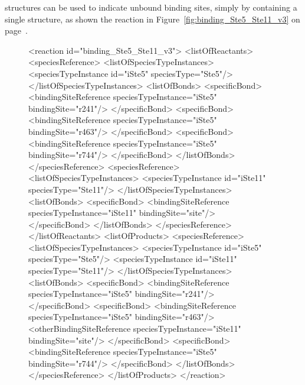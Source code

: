 \documentclass{cekarticle}
\begin{document}
 structures can be
used to indicate unbound binding sites, simply by containing a single 
structure, as shown the reaction in Figure~\ref{fig:binding_Ste5_Ste11_v3} on
page~\pageref{fig:binding_Ste5_Ste11_v3}.

\begin{figure}[h]
\begin{example}
<reaction id="binding_Ste5_Ste11_v3">
    <listOfReactants>
        <speciesReference>
            <listOfSpeciesTypeInstances>
                <speciesTypeInstance id="iSte5" speciesType="Ste5"/>
            </listOfSpeciesTypeInstances>
            <listOfBonds>
                <specificBond>
                    <bindingSiteReference speciesTypeInstance="iSte5" bindingSite="r241"/>
                </specificBond>
                <specificBond>
                    <bindingSiteReference speciesTypeInstance="iSte5" bindingSite="r463"/>
                </specificBond>
                <specificBond>
                    <bindingSiteReference speciesTypeInstance="iSte5" bindingSite="r744"/>
                </specificBond>
            </listOfBonds>
        </speciesReference>
        <speciesReference>
            <listOfSpeciesTypeInstances>
                <speciesTypeInstance id="iSte11" speciesType="Ste11"/>
            </listOfSpeciesTypeInstances>
            <listOfBonds>
                <specificBond>
                    <bindingSiteReference speciesTypeInstance="iSte11" bindingSite="site"/>
                </specificBond>
            </listOfBonds>
         </speciesReference>
    </listOfReactants>
    <listOfProducts>
        <speciesReference>
            <listOfSpeciesTypeInstances>
                <speciesTypeInstance id="iSte5" speciesType="Ste5"/>
                <speciesTypeInstance id="iSte11" speciesType="Ste11"/>
            </listOfSpeciesTypeInstances>
            <listOfBonds>
                <specificBond>
                    <bindingSiteReference speciesTypeInstance="iSte5" bindingSite="r241"/>
                </specificBond>
                <specificBond>
                    <bindingSiteReference speciesTypeInstance="iSte5" bindingSite="r463"/>
                    <otherBindingSiteReference
                        speciesTypeInstance="iSte11" bindingSite="site"/>
                </specificBond>
                <specificBond>
                    <bindingSiteReference speciesTypeInstance="iSte5" bindingSite="r744"/>
                </specificBond>
            </listOfBonds>
        </speciesReference>
    </listOfProducts>
</reaction>

\end{example}
\end{figure}
\end{document}
